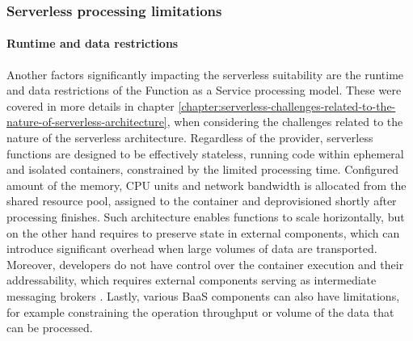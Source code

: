 

\subsubsection{Serverless processing limitations}

\paragraph{Runtime and data restrictions} \label{chapter:serverless-processing-limitations-runtime-and-data-restrictions}

Another factors significantly impacting the serverless suitability are the runtime and data restrictions of the Function as a Service processing model. These were covered in more details in chapter \ref{chapter:serverless-challenges-related-to-the-nature-of-serverless-architecture}, when considering the challenges related to the nature of the serverless architecture.
Regardless of the provider, serverless functions are designed to be effectively stateless, running code within ephemeral and isolated containers, constrained by the limited processing time. Configured amount of the memory, CPU units and network bandwidth is allocated from the shared resource pool, assigned to the container and deprovisioned shortly after processing finishes.
Such architecture enables functions to scale horizontally, but on the other hand requires to preserve state in external components, which can introduce significant overhead when large volumes of data are transported.
Moreover, developers do not have control over the container execution and their addressability, which requires external components serving as intermediate messaging brokers \cite{MartinFowlerServerless}. Lastly, various BaaS components can also have limitations, for example constraining the operation throughput or volume of the data that can be processed.


